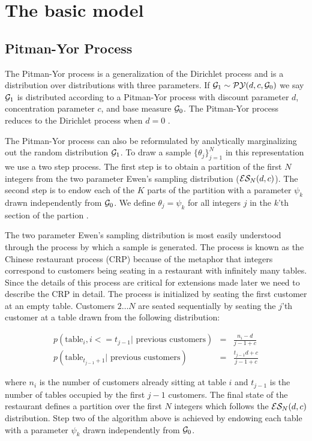 
\section{The basic model}
\label{basicModel}

\subsection{Pitman-Yor Process}

The Pitman-Yor process is a generalization of the Dirichlet process and is a distribution over distributions with three parameters.  If $\G_1 \sim \PY(d,c,\G_0)$ we say $\G_1$ is distributed according to a Pitman-Yor process with discount parameter $d$, concentration parameter $c$, and base measure $\G_0$. The Pitman-Yor process reduces to the Dirichlet process when $d = 0$ \cite{Pitman}. 

The Pitman-Yor process can also be reformulated by analytically marginalizing out the random distribution $\G_1$.  To draw a sample $\{ \theta_j \}_{j = 1}^N$ in this representation we use a two step process.  The first step is to obtain a partition of the first $N$ integers from the two parameter Ewen's sampling distribution ($\ES_N(d,c)$).  The second step is to endow each of the $K$ parts of the partition with a parameter $\psi_k$ drawn independently from $\G_0$.  We define $\theta_j = \psi_k$ for all integers $j$ in the $k$'th section of the partion \cite{mcqueen??}.

The two parameter Ewen's sampling distribution is most easily understood through the process by which a sample is generated.  The process is known as the Chinese restaurant process (CRP) because of the metaphor that integers correspond to customers being seating in a restaurant with infinitely many tables.  Since the details of this process are critical for extensions made later we need to describe the CRP in detail. The process is initialized by seating the first customer at an empty table.  Customers $2 \dots N$ are seated sequentially by seating the $j$'th customer at a table drawn from the following distribution:

\begin{eqnarray*}
p(\textrm{table}_i, i<= t_{j-1} |\textrm{ previous customers}) &=& \frac{n_i - d}{j-1+ c}\\
p(\textrm{table}_{t_{j-1} +1} | \textrm{ previous customers}) &=& \frac{t_{j-1}d +c}{j-1+c}
\end{eqnarray*}

where $n_i$ is the number of customers already sitting at table $i$ and $t_{j-1}$ is the number of tables occupied by the first $j-1$ customers.  The final state of the restaurant defines a partition over the first $N$ integers which follows the $\ES_N(d,c)$ distribution.  Step two of the algorithm above is achieved by endowing each table with a parameter $\psi_k$ drawn independently from $\G_0$.

